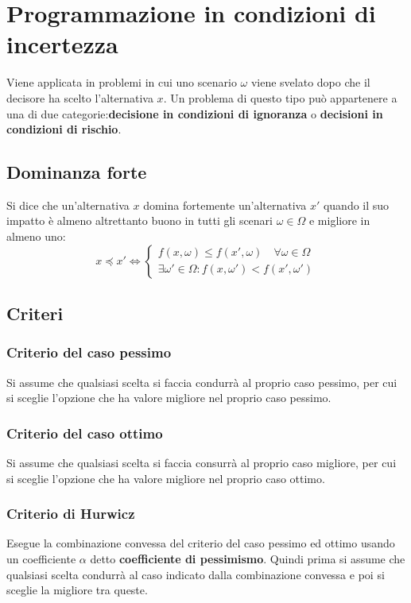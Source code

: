 \documentclass[\main/main.tex]{subfiles}
\begin{document}
\chapter{Programmazione in condizioni di incertezza}
Viene applicata in problemi in cui uno scenario $\omega$ viene svelato dopo che il decisore ha scelto l'alternativa $x$. Un problema di questo tipo può appartenere a una di due categorie:\textbf{decisione in condizioni di ignoranza} o \textbf{decisioni in condizioni di rischio}.

\section{Dominanza forte}

\begin{definition}
  Si dice che un'alternativa $x$ domina fortemente un'alternativa $x'$ quando il suo impatto è almeno altrettanto buono in tutti gli scenari $\omega \in \Omega$ e migliore in almeno uno:
  \[
    x \preceq x' \Leftrightarrow \begin{cases}
      f(x,\omega) \leq f(x',\omega) \quad \forall \omega \in \Omega \\
      \exists \omega' \in \Omega: f(x,\omega') < f(x',\omega')
    \end{cases}
  \]
\end{definition}

\section{Criteri}
\subsection{Criterio del caso pessimo}
Si assume che qualsiasi scelta si faccia condurrà al proprio caso pessimo, per cui si sceglie l'opzione che ha valore migliore nel proprio caso pessimo.

\subsection{Criterio del caso ottimo}
Si assume che qualsiasi scelta si faccia consurrà al proprio caso migliore, per cui si sceglie l'opzione che ha valore migliore nel proprio caso ottimo.

\subsection{Criterio di Hurwicz}
Esegue la combinazione convessa del criterio del caso pessimo ed ottimo usando un coefficiente $\alpha$ detto \textbf{coefficiente di pessimismo}. Quindi prima si assume che qualsiasi scelta condurrà al caso indicato dalla combinazione convessa e poi si sceglie la migliore tra queste.
\end{document}
